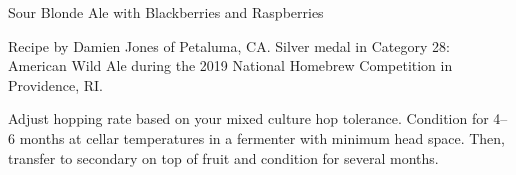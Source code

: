 \stylesection{\stylefruitbeer}

\begin{recipe}{Sour Blonde Ale with Blackberries and Raspberries}

\begin{aboutblock}
Recipe by Damien Jones of Petaluma, CA. Silver medal in Category 28: American
Wild Ale during the 2019 National Homebrew Competition in Providence, RI.
\sourceaha
\end{aboutblock}


\begin{methodandtiming}
 
\begin{mashsteps}
\end{mashsteps}

\begin{fermentationsteps}
\end{fermentationsteps}

\begin{directions}
Adjust hopping rate based on your mixed culture hop tolerance.
Condition for 4--6 months at cellar temperatures in a fermenter with
minimum head space. Then, transfer to secondary on top of fruit
and condition for several months.
\end{directions}

\end{methodandtiming}

\recipebreak

\begin{ingredientsblock}

\begin{malts}
\end{malts}

\begin{hops}
\end{hops}


\begin{twists}
\end{twists}

\end{ingredientsblock}

\end{recipe}
